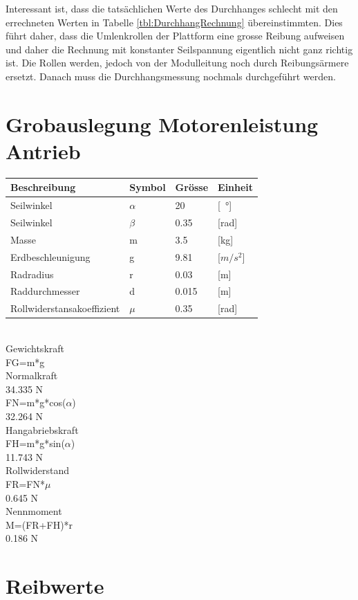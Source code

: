 \documentclass[a4paper]{report}
\begin{document}
Interessant ist, dass die tatsächlichen Werte des Durchhanges schlecht mit den errechneten Werten in Tabelle \ref{tbl:DurchhangRechnung} übereinstimmten. Dies führt daher, dass die Umlenkrollen der Plattform eine grosse Reibung aufweisen und daher die Rechnung mit konstanter Seilspannung eigentlich nicht ganz richtig ist. Die Rollen werden, jedoch von der Modulleitung noch durch Reibungsärmere ersetzt. Danach muss die Durchhangsmessung nochmals durchgeführt werden.

\section{Grobauslegung Motorenleistung Antrieb}
\begin{tabular}{|p{}|p{}|p{}|p{}|}
	\hline
	\textbf{Beschreibung} & \textbf{Symbol} & \textbf{Grösse}& \textbf{Einheit}  \\
	\hline
	Seilwinkel & $\alpha$ & 20 & [\SI{}{\degree}] \\
	\hline
	Seilwinkel & $\beta$ & 0.35 & [rad] \\
	\hline
	Masse & m & 3.5 & [kg] \\
	\hline
	Erdbeschleunigung & g & 9.81 & [$m/s^2$] \\
	\hline
	Radradius & r & 0.03 & [m] \\
	\hline
	Raddurchmesser & d & 0.015 & [m] \\
	\hline
	Rollwiderstansakoeffizient & $\mu$ & 0.35 & [rad] \\
	\hline
\end{tabular}	\\
	Gewichtskraft	\\
	FG=m*g	\\
	Normalkraft	\\
	34.335 N	\\
	FN=m*g*cos($\alpha$)	\\
	32.264 N	\\
	Hangabriebskraft	\\
	FH=m*g*sin($\alpha$)	\\
	11.743 N	\\
	Rollwiderstand	\\
	FR=FN*$\mu$	\\
	0.645 N	\\
	Nennmoment	\\
	M=(FR+FH)*r	\\
	0.186 N	\\

\section{Reibwerte}
\end{document}
